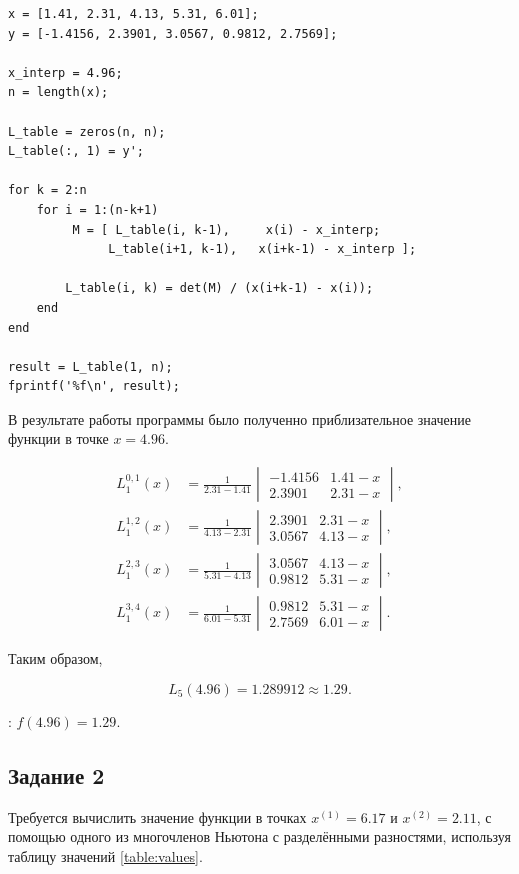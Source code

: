 \begin{listing}[H]
\caption{Реализация вычислительной схемы Эйткена в MATLAB}
\vspace{-20pt}
\label{lst:task2}
\begin{verbatim}
x = [1.41, 2.31, 4.13, 5.31, 6.01];
y = [-1.4156, 2.3901, 3.0567, 0.9812, 2.7569];

x_interp = 4.96;
n = length(x);

L_table = zeros(n, n);
L_table(:, 1) = y';

for k = 2:n
    for i = 1:(n-k+1)
         M = [ L_table(i, k-1),     x(i) - x_interp;
              L_table(i+1, k-1),   x(i+k-1) - x_interp ];

        L_table(i, k) = det(M) / (x(i+k-1) - x(i));
    end
end

result = L_table(1, n);
fprintf('%f\n', result);
\end{verbatim}
\end{listing}
В результате работы программы было полученно приблизательное значение функции в точке $x = 4.96$.

\[
\begin{aligned}
L_1^{0,1}(x)&=
\frac{1}{2.31-1.41}
\begin{vmatrix}
-1.4156 & 1.41-x\\
2.3901 & 2.31-x
\end{vmatrix},\\
L_1^{1,2}(x)&=
\frac{1}{4.13-2.31}
\begin{vmatrix}
2.3901 & 2.31-x\\
3.0567 & 4.13-x
\end{vmatrix},\\
L_1^{2,3}(x)&=
\frac{1}{5.31-4.13}
\begin{vmatrix}
3.0567 & 4.13-x\\
0.9812 & 5.31-x
\end{vmatrix},\\
L_1^{3,4}(x)&=
\frac{1}{6.01-5.31}
\begin{vmatrix}
0.9812 & 5.31-x\\
2.7569 & 6.01-x
\end{vmatrix}.
\end{aligned}
\]

Таким образом,

\[
L_5(4.96) = 1.289912 \approx 1.29.
\]

: $f(4.96) = 1.29.$

\subsection{Задание 2}
Требуется вычислить значение функции в точках $x^{(1)}= 6.17$ и $x^{(2)}= 2.11$, с помощью одного из многочленов Ньютона с разделёнными разностями, используя таблицу значений \ref{table:values}.

